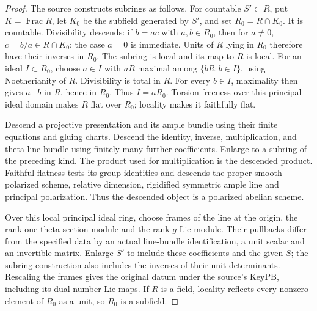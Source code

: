 \begin{proof}
The source constructs subrings as follows.
For countable \(S'\subset R\), put \(K=\operatorname{Frac}R\), let
\(K_0\) be the subfield generated by \(S'\), and set \(R_0=R\cap K_0\).
It is countable.  Divisibility descends: if \(b=ac\) with
\(a,b\in R_0\), then for \(a\ne0\), \(c=b/a\in R\cap K_0\);
the case \(a=0\) is immediate.  Units of \(R\) lying in \(R_0\)
therefore have their inverses in \(R_0\).
The subring is local and its map to \(R\) is local.
For an ideal \(I\subset R_0\), choose \(a\in I\) with \(aR\)
maximal among \(\{bR:b\in I\}\), using Noetherianity of \(R\).
Divisibility is total in \(R\).  For every \(b\in I\), maximality
then gives \(a\mid b\) in \(R\), hence in \(R_0\).
Thus \(I=aR_0\).  Torsion freeness over this principal ideal domain
makes \(R\) flat over \(R_0\); locality makes it faithfully flat.

Descend a projective presentation and its ample bundle using their
finite equations and gluing charts.  Descend the identity, inverse,
multiplication, and theta line bundle using finitely many further
coefficients.  Enlarge to a subring of the preceding kind.
The product used for multiplication is the descended product.
Faithful flatness tests its group identities and descends the
proper smooth polarized scheme, relative dimension, rigidified
symmetric ample line and principal polarization.
Thus the descended object is a polarized abelian scheme.

Over this local principal ideal ring, choose frames of the line at
the origin, the rank-one theta-section module and the rank-\(g\)
Lie module.  Their pullbacks differ from the specified data by an
actual line-bundle identification, a unit scalar and an invertible
matrix.  Enlarge \(S'\) to include these coefficients and the given
\(S\); the subring construction also includes the inverses of their
unit determinants.  Rescaling the frames gives the original datum
under the source's \(\mathrm{KeyPB}\), including its dual-number
Lie maps.  If \(R\) is a field, locality reflects every nonzero
element of \(R_0\) as a unit, so \(R_0\) is a subfield.
\end{proof}

